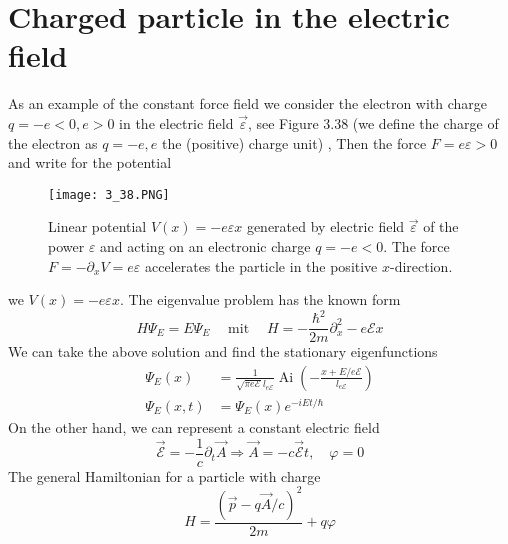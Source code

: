 \section{Charged particle in the electric field}
As an example of the constant force field we consider the electron with charge $q = -e <0, e> 0$ in the electric field $\vec{\varepsilon}$, see Figure 3.38 (we define the charge of the electron as $q = -e, e$ the (positive) charge unit) , Then the force $F = e\varepsilon> 0$ and write for the potential
\begin{figure}[ht]
    \begin{minipage}{0.5\textwidth}
        \centering
        \texttt{[image: 3\_38.PNG]}
    \end{minipage}
    \begin{minipage}{0.5\textwidth}
        \caption{Linear potential $V (x) = -e\varepsilon x$ generated by electric field $\vec{\varepsilon}$ of the power $\varepsilon$ and acting on an electronic charge $q = -e <0$. The force $F = -\partial_xV = e\varepsilon$ accelerates the particle in the positive $x$-direction.}
    \end{minipage}
\end{figure}
we $V (x) = -e\varepsilon x$. The eigenvalue problem has the known form
\begin{equation}
    H \Psi_{E}=E \Psi_{E} \quad \operatorname{mit} \quad H=-\frac{\hbar^{2}}{2 m} \partial_{x}^{2}-e \mathcal{E} x
    \end{equation}
We can take the above solution and find the stationary eigenfunctions
\begin{equation}
\begin{aligned} \Psi_{E}(x) &=\frac{1}{\sqrt{\pi e \mathcal{E}} l_{e \mathcal{E}}} \operatorname{Ai}\left(-\frac{x+E / e \mathcal{E}}{l_{e \mathcal{E}}}\right) \\ \Psi_{E}(x, t) &=\Psi_{E}(x) e^{-i E t / \hbar} \end{aligned}
\end{equation}
On the other hand, we can represent a constant electric field
\begin{equation}
    \overrightarrow{\mathcal{E}}=-\frac{1}{c} \partial_{t} \vec{A} \Rightarrow \vec{A}=-c \overrightarrow{\mathcal{E}} t, \quad \varphi=0
    \end{equation}
The general Hamiltonian for a particle with charge
\begin{equation}
    H=\frac{(\vec{p}-q \vec{A} / c)^{2}}{2 m}+q \varphi
    \end{equation}
